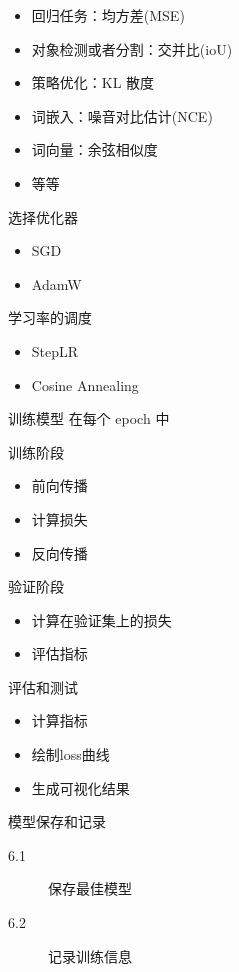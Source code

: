 \begin{description}
\begin{description}
\begin{itemize}
			\item 回归任务：均方差(MSE)
			\item 对象检测或者分割：交并比(ioU)
			\item 策略优化：KL 散度
			\item 词嵌入：噪音对比估计(NCE)
			\item 词向量：余弦相似度
			\item 等等
		\end{itemize}
		\item[3.2] 选择优化器
		\begin{itemize}
			\item SGD
			\item AdamW
		\end{itemize}
		\item[3.3] 学习率的调度
		\begin{itemize}
			\item StepLR
			\item Cosine Annealing
		\end{itemize}
	\end{description}
	\item[4.] 训练模型
	在每个 epoch 中
	\begin{description}
		\item 训练阶段
		\begin{itemize}
			\item 前向传播
			\item 计算损失
			\item 反向传播
		\end{itemize}
		\item 验证阶段
		\begin{itemize}
			\item 计算在验证集上的损失
			\item 评估指标
		\end{itemize}
	\end{description}
	\item[5.] 评估和测试
	\begin{itemize}
		\item 计算指标
		\item 绘制loss曲线
		\item 生成可视化结果
	\end{itemize}
	\item[6.] 模型保存和记录
	\begin{description}
		\item[6.1] 保存最佳模型
		\item[6.2] 记录训练信息
		\begin{itemize}

\end{itemize}
\end{description}
\end{description}
